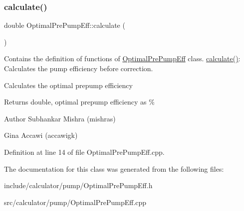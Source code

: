 \subsubsection{\texorpdfstring{calculate()}{calculate()}}
{\footnotesize\ttfamily double Optimal\+Pre\+Pump\+Eff\+::calculate (\begin{DoxyParamCaption}{ }\end{DoxyParamCaption})}



Contains the definition of functions of \hyperlink{class_optimal_pre_pump_eff}{Optimal\+Pre\+Pump\+Eff} class. \hyperlink{class_optimal_pre_pump_eff_a7ced63984a89975c4f8f54642701d841}{calculate()}\+: Calculates the pump efficiency before correction. 

Calculates the optimal prepump efficiency \begin{DoxyReturn}{Returns}
double, optimal prepump efficiency as \%
\end{DoxyReturn}
\begin{DoxyAuthor}{Author}
Subhankar Mishra (mishras) 

Gina Accawi (accawigk) 
\end{DoxyAuthor}


Definition at line 14 of file Optimal\+Pre\+Pump\+Eff.\+cpp.



The documentation for this class was generated from the following files\+:\begin{DoxyCompactItemize}
\item 
include/calculator/pump/Optimal\+Pre\+Pump\+Eff.\+h\item 
src/calculator/pump/Optimal\+Pre\+Pump\+Eff.\+cpp\end{DoxyCompactItemize}
